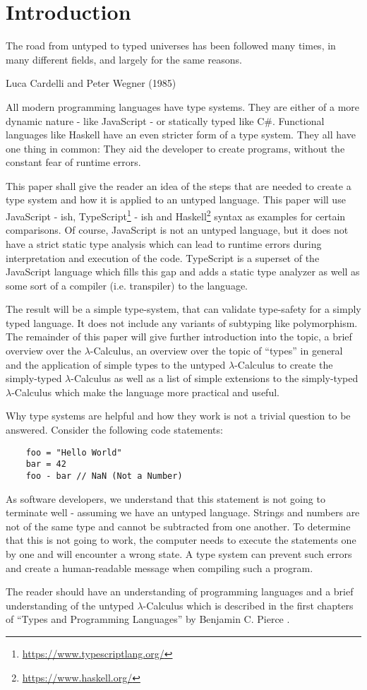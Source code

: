 \section{Introduction}

\epigraph{
    The road from untyped to typed universes has been followed many times,
    in many different fields, and largely for the same reasons.
}
{Luca Cardelli and Peter Wegner (1985)}

All modern programming languages have type systems.
They are either of a more dynamic nature - like JavaScript -
or statically typed like C\#. Functional languages like Haskell have
an even stricter form of a type system. They all have one thing in
common: They aid the developer to create programs, without 
the constant fear of runtime errors.

This paper shall give the reader an idea of the steps that
are needed to create a type system and how it is applied to
an untyped language. This paper will use JavaScript - ish,
TypeScript\footnote{\url{https://www.typescriptlang.org/}} - ish
and Haskell\footnote{\url{https://www.haskell.org/}}
syntax as examples for certain comparisons.
Of course, JavaScript is not an untyped language, but
it does not have a strict static type analysis which can lead
to runtime errors during interpretation and execution of the code.
TypeScript is a superset of the JavaScript language which fills this
gap and adds a static type analyzer as well as some sort of a compiler
(i.e. transpiler) to the language.

The result will be a simple type-system, that can validate
type-safety for a simply typed language. It does not include
any variants of subtyping like polymorphism. The remainder
of this paper will give further introduction into the topic,
a brief overview over the $\lambda$-Calculus, an overview
over the topic of ``types'' in general and the application
of simple types to the untyped $\lambda$-Calculus to create the
simply-typed $\lambda$-Calculus as well as a list of simple
extensions to the simply-typed $\lambda$-Calculus which make
the language more practical and useful.

Why type systems are helpful and how they work
is not a trivial question to be answered. Consider
the following code statements:

\begin{verbatim}
    foo = "Hello World"
    bar = 42
    foo - bar // NaN (Not a Number)
\end{verbatim}

As software developers, we understand that this statement
is not going to terminate well - assuming we have an untyped
language. Strings and numbers are not
of the same type and cannot be subtracted from one another. To determine
that this is not going to work, the computer needs to execute
the statements one by one and will encounter a wrong state.
A type system can prevent such errors and create a
human-readable message when compiling such a program.

The reader should have an understanding of programming
languages and a brief understanding of the untyped
$\lambda$-Calculus which is described in the first
chapters of ``Types and Programming Languages'' by
Benjamin C. Pierce \cite{pierce2002ProgLang}.
